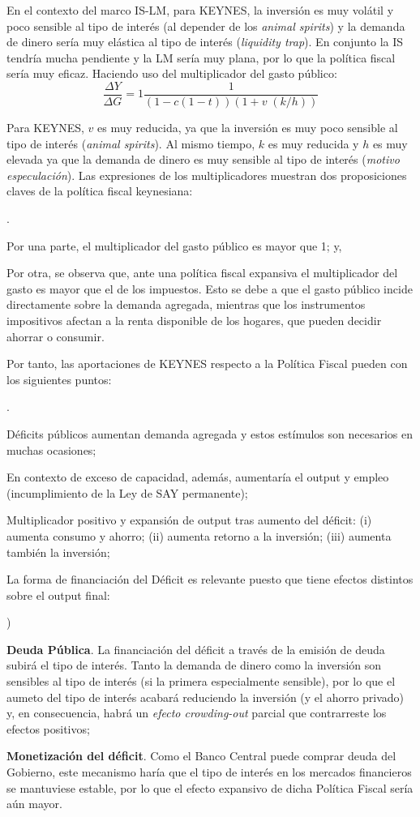 \documentclass[10pt,a4paper]{article}
\newcounter{alphaitem}
\newcounter{numitem}
\newenvironment{la}
      {\begin{list}{\alph{alphaitem})}{%
          \usecounter{alphaitem}%
          \setlength{\leftmargin}{1cm}%
          \setlength{\parskip}{3pt}%
          \setlength{\itemsep}{0pt}%
          \setlength{\parsep}{0pt}%
      }}
      {\end{list}}
\newenvironment{lnum}
      {\begin{list}{\arabic{numitem}.}{%
          \usecounter{numitem}%
          \setlength{\leftmargin}{1cm}%
          \setlength{\parskip}{3pt}%
          \setlength{\itemsep}{0pt}%
          \setlength{\parsep}{0pt}%
      }}
      {\end{list}}
\begin{document}
En el contexto del marco IS-LM, para KEYNES, la inversión es muy volátil y poco sensible al tipo de interés (al depender de los \textit{animal spirits}) y la demanda de dinero sería muy elástica al tipo de interés (\textit{liquidity trap}). En conjunto la IS tendría mucha pendiente y la LM sería muy plana, por lo que la política fiscal sería muy eficaz. Haciendo uso del multiplicador del gasto público: 
$$\frac{\Delta Y}{\Delta G}=1\frac{1}{(1-c(1-t))(1+v\;(k/h))}$$ 

Para KEYNES, $v$ es muy reducida, ya que la inversión es muy poco sensible al tipo de interés (\textit{animal spirits}). Al mismo tiempo, $k$ es muy reducida y $h$ es muy elevada ya que la demanda de dinero es muy sensible al tipo de interés (\textit{motivo especulación}). Las expresiones de los multiplicadores muestran dos proposiciones claves de la política fiscal keynesiana:
\begin{lnum}
    \item Por una parte, el multiplicador del gasto público es mayor que 1; y,
    \item Por otra, se observa que, ante una política fiscal expansiva el multiplicador del gasto es mayor que el de los impuestos. Esto se debe a que el gasto público incide directamente sobre la demanda agregada, mientras que los instrumentos impositivos afectan a la renta disponible de los hogares, que pueden decidir ahorrar o consumir.
\end{lnum}

Por tanto, las aportaciones de KEYNES respecto a la Política Fiscal pueden con los siguientes puntos:
\begin{lnum}
    \item Déficits públicos aumentan demanda agregada y estos estímulos son necesarios en muchas ocasiones;
    \item En contexto de exceso de capacidad, además, aumentaría el output y empleo (incumplimiento de la Ley de SAY permanente);
    \item Multiplicador positivo y expansión de output tras aumento del déficit: (i) aumenta consumo y ahorro; (ii) aumenta retorno a la inversión; (iii) aumenta también la inversión;
    \item La forma de financiación del Déficit es relevante puesto que tiene efectos distintos sobre el output final:
    \begin{la}
        \item \textbf{Deuda Pública}. La financiación del déficit a través de la emisión de deuda subirá el tipo de interés. Tanto la demanda de dinero como la inversión son sensibles al tipo de interés (si la primera especialmente sensible), por lo que el aumeto del tipo de interés acabará reduciendo la inversión (y el ahorro privado) y, en consecuencia, habrá un \textit{efecto crowding-out} parcial que contrarreste los efectos positivos;
        \item \textbf{Monetización del déficit}. Como el Banco Central puede comprar deuda del Gobierno, este mecanismo haría que el tipo de interés en los mercados financieros se mantuviese estable, por lo que el efecto expansivo de dicha Política Fiscal sería aún mayor. 
    \end{la}
\end{lnum}
\end{document}
